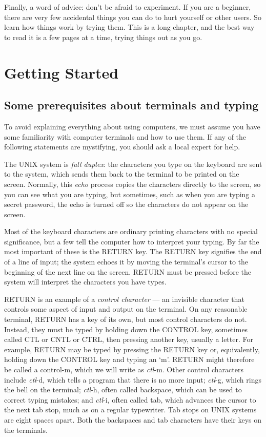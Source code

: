 Finally, a word of advice: don't be afraid to experiment. If you are a beginner,
there are very few accidental things you can do to hurt yourself or other
users. So learn how things work by trying them. This is a long chapter, and the
best way to read it is a few pages at a time, trying things out as you go.


\section{Getting Started}
\subsection{Some prerequisites about terminals and typing}

To avoid explaining everything about using computers, we must assume you have
some familiarity with computer terminals and how to use them. If any of the
following statements are mystifying, you should ask a local expert for help.

The UNIX system is \textit{full duplex}: the characters you type on the keyboard
are sent to the system, which sends them back to the terminal to be printed on
the screen. Normally, this \textit{echo} process copies the characters directly
to the screen, so you can see what you are typing, but sometimes, such as when
you are typing a secret password, the echo is turned off so the characters do
not appear on the screen.

Most of the keyboard characters are ordinary printing characters with no special
significance, but a few tell the computer how to interpret your typing. By far
the most important of these is the RETURN key. The RETURN key signifies the end
of a line of input; the system echoes it by moving the terminal's cursor to the
beginning of the next line on the screen. RETURN must be pressed before the
system will interpret the characters you have types.

RETURN is an example of a \textit{control character} --- an invisible character
that controls some aspect of input and output on the terminal. On any reasonable
terminal, RETURN has a key of its own, but most control characters do
not. Instead, they must be typed by holding down the CONTROL key, sometimes
called CTL or CNTL or CTRL, then pressing another key, usually a letter. For
example, RETURN may be typed by pressing the RETURN key or, equivalently,
holding down the CONTROL key and typing an `m'. RETURN might therefore be called
a control-m, which we will write as \textit{ctl}-m. Other control characters
include \textit{ctl}-d, which tells a program that there is no more input;
\textit{ctl}-g, which rings the bell on the terminal; \textit{ctl}-h, often
called backspace, which can be used to correct typing mistakes; and
\textit{ctl}-i, often called tab, which advances the cursor to the next tab
stop, much as on a regular typewriter. Tab stops on UNIX systems are eight
spaces apart. Both the backspaces and tab characters have their keys on the
terminals.


